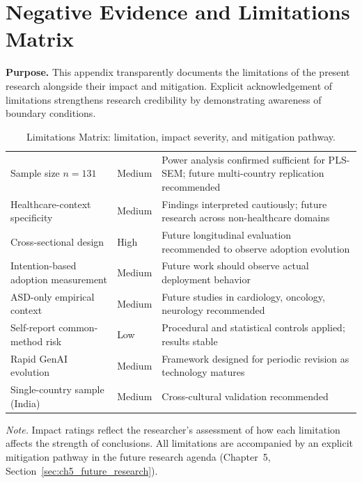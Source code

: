 \chapter{Negative Evidence and Limitations Matrix}
\label{app:negative_evidence}

\noindent\textbf{Purpose.} This appendix transparently documents the limitations of the present research alongside their impact and mitigation. Explicit acknowledgement of limitations strengthens research credibility by demonstrating awareness of boundary conditions.

{\tablestripes\tablefontsize
{}
\begin{xltabular}{\textwidth}{@{} >{\raggedright\arraybackslash}p{4cm} >{\centering\arraybackslash}p{2cm} L @{}}
\caption[Negative Evidence Matrix]{Limitations Matrix: limitation, impact severity, and mitigation pathway.}\label{tab:negative_evidence_matrix} \\
\toprule
{} &  &  \\
\midrule
\endfirsthead
\endhead
\bottomrule
\endlastfoot
Sample size $n=131$ & Medium & Power analysis confirmed sufficient for PLS-SEM; future multi-country replication recommended \\
\addlinespace
Healthcare-context specificity & Medium & Findings interpreted cautiously; future research across non-healthcare domains \\
\addlinespace
Cross-sectional design & High & Future longitudinal evaluation recommended to observe adoption evolution \\
\addlinespace
Intention-based adoption measurement & Medium & Future work should observe actual deployment behavior \\
\addlinespace
ASD-only empirical context & Medium & Future studies in cardiology, oncology, neurology recommended \\
\addlinespace
Self-report common-method risk & Low & Procedural and statistical controls applied; results stable \\
\addlinespace
Rapid GenAI evolution & Medium & Framework designed for periodic revision as technology matures \\
\addlinespace
Single-country sample (India) & Medium & Cross-cultural validation recommended \\
\end{xltabular}}
\vspace{0.3em}\noindent\textit{Note.} Impact ratings reflect the researcher's assessment of how each limitation affects the strength of conclusions. All limitations are accompanied by an explicit mitigation pathway in the future research agenda (Chapter~5, Section~\ref{sec:ch5_future_research}).
